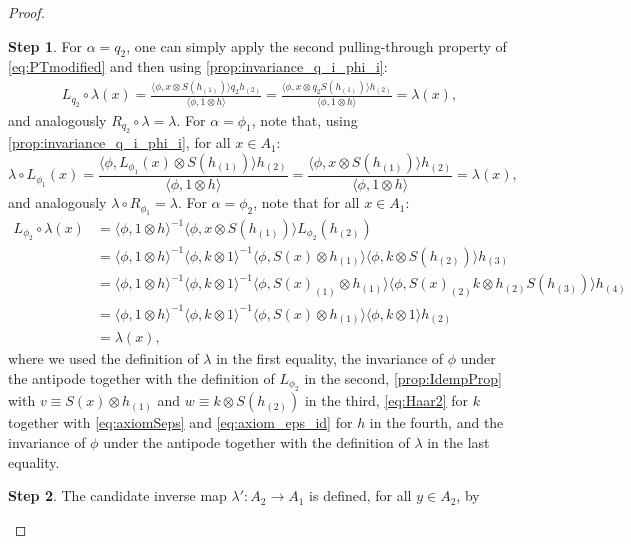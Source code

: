\documentclass[a4paper,10pt]{amsart}
\newcommand{\eval}[2]{\langle #1 , #2\rangle}
\theoremstyle{definition}
\newtheorem{step-goursat}{Step}
\begin{document}
\begin{proof}
\begin{step-goursat}
    For $\alpha = q_2$, one can simply apply the second pulling-through property of \cref{eq:PTmodified} and then using \cref{prop:invariance_q_i_phi_i}:
    \begin{align*}
        L_{q_2} \circ \lambda(x)
        = \frac{\eval{\phi}{x \otimes S(h_{(1)})} q_2 h_{(2)}}{\eval{\phi}{1\otimes h}}
        = \frac{\eval{\phi}{x \otimes q_2S(h_{(1)})} h_{(2)}}{\eval{\phi}{1\otimes h}}
        = \lambda(x),
    \end{align*}
    and analogously $R_{q_2} \circ \lambda = \lambda$.
    For $\alpha = \phi_1$,  note that, using \cref{prop:invariance_q_i_phi_i}, for all $x\in A_1$:
    \[
        \lambda \circ L_{\phi_1}(x) = \frac{\eval{\phi}{L_{\phi_1}(x)\otimes S(h_{(1)})} h_{(2)}}{\eval{\phi}{1\otimes h}} = \frac{\eval{\phi}{x\otimes S(h_{(1)})} h_{(2)}}{\eval{\phi}{1\otimes h}} = \lambda(x),
    \]
    and analogously $\lambda \circ R_{\phi_1} = \lambda$.
    For $\alpha = \phi_2$, note that for all $x\in A_1$: 
    \begin{align*}
        L_{\phi_2} \circ \lambda(x) &= \eval{\phi}{1\otimes h}^{-1} \eval{\phi}{x\otimes S(h_{(1)})} L_{\phi_2}(h_{(2)})\\&= \eval{\phi}{1\otimes h}^{-1} \eval{\phi}{k\otimes 1}^{-1} \eval{\phi}{S(x)\otimes h_{(1)}} \eval{\phi}{k\otimes S(h_{(2)})} h_{(3)}\\
        &= \eval{\phi}{1\otimes h}^{-1} \eval{\phi}{k\otimes 1}^{-1} \eval{\phi}{S(x)_{(1)}\otimes h_{(1)}} \eval{\phi}{S(x)_{(2)}k\otimes h_{(2)}S(h_{(3)})}h_{(4)}\\
        &= \eval{\phi}{1\otimes h}^{-1} \eval{\phi}{k\otimes 1}^{-1} \eval{\phi}{S(x)\otimes h_{(1)}} \eval{\phi}{k\otimes 1}h_{(2)}\\
        &=\lambda(x),
    \end{align*}
    where we used the definition of $\lambda$ in the first equality, the invariance of $\phi$ under the antipode together with the definition of $L_{\phi_2}$ in the second, \cref{prop:IdempProp} with $v\equiv S(x) \otimes h_{(1)}$ and $w\equiv k\otimes S(h_{(2)})$ in the third, \cref{eq:Haar2} for $k$ together with \cref{eq:axiomSeps} and \cref{eq:axiom_eps_id} for $h$ in the fourth, and the invariance of $\phi$ under the antipode together with the definition of $\lambda$ in the last equality.
    \end{step-goursat}
    \begin{step-goursat}
    The candidate inverse map $\lambda' : A_2 \to A_1$ is defined, for all $y\in A_2$, by
    \begin{equation}

\end{equation}
\end{step-goursat}
\end{proof}
\end{document}

